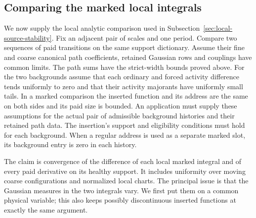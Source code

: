 \subsection{Comparing the marked local integrals}
\label{sec:marked-kernel-convergence}
We now supply the local analytic comparison used in
Subsection~\ref{sec:local-source-stability}. Fix an adjacent pair of
scales and one period. Compare two sequences of paid transitions
on the same support dictionary. Assume their fine and coarse
canonical path coefficients, retained Gaussian rows and couplings
have common limits. The path sums have the strict-width bounds
proved above. For the two backgrounds assume that each ordinary
and forced activity difference tends uniformly to zero and that
their activity majorants have uniformly small tails. In a marked
comparison the inserted function and its address are the same
on both sides and its paid size is bounded. An application must supply
these assumptions for the actual pair of admissible background histories
and their retained path data. The insertion's support and eligibility
conditions must hold for each background. When a regular address is used
as a separate marked slot, its background entry is zero in each history.

The claim is convergence of the difference of each local marked
integral and of every paid derivative on its healthy support.
It includes uniformity over moving coarse configurations and
normalized local charts. The principal issue is that the Gaussian
measures in the two integrals vary. We first put them on a common
physical variable; this also keeps possibly discontinuous inserted
functions at exactly the same argument.

